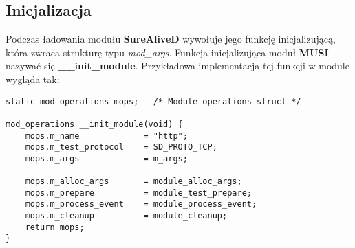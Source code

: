 \documentclass[polish,12pt]{article}
\begin{document}
\subsection{Inicjalizacja}
Podczas ładowania modułu \textbf{SureAliveD} wywołuje jego funkcję inicjalizującą, która zwraca
strukturę typu \textit{mod\_args}. Funkcja inicjalizująca moduł \textbf{MUSI} nazywać się
\textbf{\_\_init\_module}. Przykładowa implementacja tej funkcji w module wygląda tak:
{\small
\begin{verbatim}
static mod_operations mops;   /* Module operations struct */

mod_operations __init_module(void) {
    mops.m_name             = "http";
    mops.m_test_protocol    = SD_PROTO_TCP;
    mops.m_args             = m_args;

    mops.m_alloc_args       = module_alloc_args;
    mops.m_prepare          = module_test_prepare;
    mops.m_process_event    = module_process_event;
    mops.m_cleanup          = module_cleanup;
    return mops;
}
\end{verbatim}
}
\end{document}
